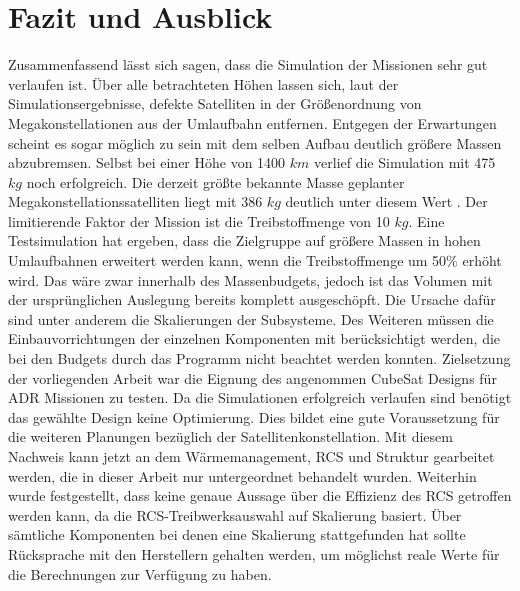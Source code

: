 \chapter{Fazit und Ausblick}
Zusammenfassend lässt sich sagen, dass die Simulation der Missionen sehr gut verlaufen ist. Über alle betrachteten Höhen lassen sich, laut der Simulationsergebnisse, defekte Satelliten in der Größenordnung von Megakonstellationen aus der Umlaufbahn entfernen. Entgegen der Erwartungen scheint es sogar möglich zu sein mit dem selben Aufbau deutlich größere Massen abzubremsen. Selbst bei einer Höhe von 1400 $km$ verlief die Simulation mit 475 $kg$ noch erfolgreich. Die derzeit größte bekannte Masse geplanter Megakonstellationssatelliten liegt mit 386 $kg$ deutlich unter diesem Wert \cite{BenLarbi.2017}. Der limitierende Faktor der Mission ist die Treibstoffmenge von 10 $kg$. Eine Testsimulation hat ergeben, dass die Zielgruppe auf größere Massen in hohen Umlaufbahnen erweitert werden kann, wenn die Treibstoffmenge um 50\% erhöht wird. Das wäre zwar innerhalb des Massenbudgets, jedoch ist das Volumen mit der ursprünglichen Auslegung bereits komplett ausgeschöpft. Die Ursache dafür sind unter anderem die Skalierungen der Subsysteme. Des Weiteren müssen die Einbauvorrichtungen der einzelnen Komponenten mit berücksichtigt werden, die bei den Budgets durch das Programm nicht beachtet werden konnten. Zielsetzung der vorliegenden Arbeit war die Eignung des angenommen CubeSat Designs für ADR Missionen zu testen. Da die  Simulationen erfolgreich verlaufen sind benötigt das gewählte Design keine Optimierung. Dies bildet eine gute Voraussetzung für die weiteren Planungen bezüglich der Satellitenkonstellation. Mit diesem Nachweis kann jetzt an dem Wärmemanagement, RCS und Struktur gearbeitet werden, die in dieser Arbeit nur untergeordnet behandelt wurden. Weiterhin wurde festgestellt, dass keine genaue Aussage über die Effizienz des RCS getroffen werden kann, da die RCS-Treibwerksauswahl auf Skalierung basiert. Über sämtliche Komponenten bei denen eine Skalierung stattgefunden hat sollte Rücksprache mit den Herstellern gehalten werden, um möglichst reale Werte für die Berechnungen zur Verfügung zu haben. 
